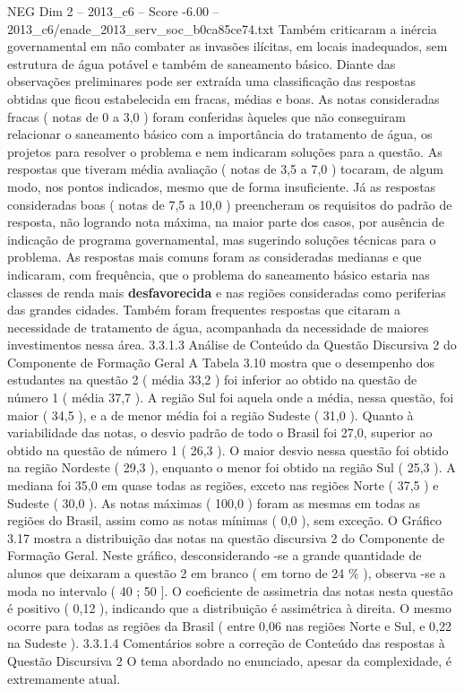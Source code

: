 \begin{textsample}{NEG Dim 2 – 2013\_c6 – Score -6.00 – 2013\_c6/enade\_2013\_serv\_soc\_b0ca85ce74.txt}
Também criticaram a inércia governamental em não combater as invasões ilícitas, em locais inadequados, sem estrutura de água potável e também de saneamento básico.
Diante das observações preliminares pode ser extraída uma classificação das respostas obtidas que ficou estabelecida em fracas, médias e boas.
As notas consideradas fracas ( notas de 0 a 3,0 ) foram conferidas àqueles que não conseguiram relacionar o saneamento básico com a importância do tratamento de água, os projetos para resolver o problema e nem indicaram soluções para a questão.
As respostas que tiveram média avaliação ( notas de 3,5 a 7,0 ) tocaram, de algum modo, nos pontos indicados, mesmo que de forma insuficiente.
Já as respostas consideradas boas ( notas de 7,5 a 10,0 ) preencheram os requisitos do padrão de resposta, não logrando nota máxima, na maior parte dos casos, por ausência de indicação de programa governamental, mas sugerindo soluções técnicas para o problema.
As respostas mais comuns foram as consideradas medianas e que indicaram, com frequência, que o problema do saneamento básico estaria nas classes de renda mais \textbf{desfavorecida} e nas regiões consideradas como periferias das grandes cidades.
Também foram frequentes respostas que citaram a necessidade de tratamento de água, acompanhada da necessidade de maiores investimentos nessa área. 3.3.1.3 Análise de Conteúdo da Questão Discursiva 2 do Componente de Formação Geral A Tabela 3.10 mostra que o desempenho dos estudantes na questão 2 ( média 33,2 ) foi inferior ao obtido na questão de número 1 ( média 37,7 ).
A região Sul foi aquela onde a média, nessa questão, foi maior ( 34,5 ), e a de menor média foi a região Sudeste ( 31,0 ).
Quanto à variabilidade das notas, o desvio padrão de todo o Brasil foi 27,0, superior ao obtido na questão de número 1 ( 26,3 ).
O maior desvio nessa questão foi obtido na região Nordeste ( 29,3 ), enquanto o menor foi obtido na região Sul ( 25,3 ).
A mediana foi 35,0 em quase todas as regiões, exceto nas regiões Norte ( 37,5 ) e Sudeste ( 30,0 ).
As notas máximas ( 100,0 ) foram as mesmas em todas as regiões do Brasil, assim como as notas mínimas ( 0,0 ), sem exceção.
O Gráfico 3.17 mostra a distribuição das notas na questão discursiva 2 do Componente de Formação Geral.
Neste gráfico, desconsiderando -se a grande quantidade de alunos que deixaram a questão 2 em branco ( em torno de 24 \% ), observa -se a moda no intervalo ( 40 ; 50 ].
O coeficiente de assimetria das notas nesta questão é positivo ( 0,12 ), indicando que a distribuição é assimétrica à direita.
O mesmo ocorre para todas as regiões da Brasil ( entre 0,06 nas regiões Norte e Sul, e 0,22 na Sudeste ). 3.3.1.4 Comentários sobre a correção de Conteúdo das respostas à Questão Discursiva 2 O tema abordado no enunciado, apesar da complexidade, é extremamente atual.

\end{textsample}
